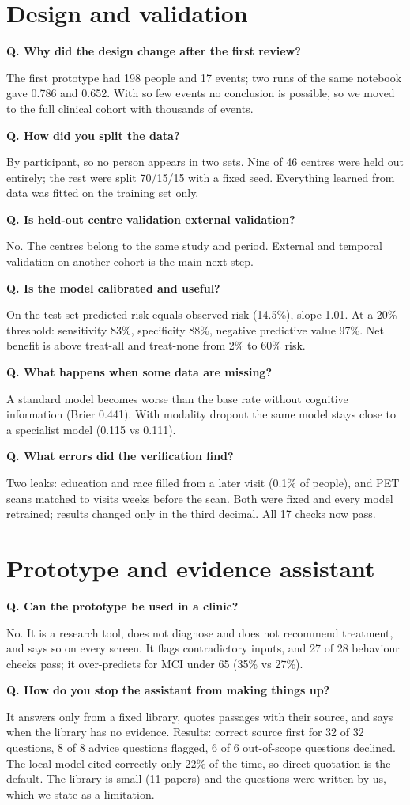 \documentclass[11pt,a4paper]{article}
\newcommand{\q}[1]{\par\medskip\textbf{Q. #1}\par}
\begin{document}
\section{Design and validation}

\q{Why did the design change after the first review?}
The first prototype had 198 people and 17 events; two runs of the same notebook gave 0.786 and 0.652. With so few events no conclusion is possible, so we moved to the full clinical cohort with thousands of events.

\q{How did you split the data?}
By participant, so no person appears in two sets. Nine of 46 centres were held out entirely; the rest were split 70/15/15 with a fixed seed. Everything learned from data was fitted on the training set only.

\q{Is held-out centre validation external validation?}
No. The centres belong to the same study and period. External and temporal validation on another cohort is the main next step.

\q{Is the model calibrated and useful?}
On the test set predicted risk equals observed risk (14.5\%), slope 1.01. At a 20\% threshold: sensitivity 83\%, specificity 88\%, negative predictive value 97\%. Net benefit is above treat-all and treat-none from 2\% to 60\% risk.

\q{What happens when some data are missing?}
A standard model becomes worse than the base rate without cognitive information (Brier 0.441). With modality dropout the same model stays close to a specialist model (0.115 vs 0.111).

\q{What errors did the verification find?}
Two leaks: education and race filled from a later visit (0.1\% of people), and PET scans matched to visits weeks before the scan. Both were fixed and every model retrained; results changed only in the third decimal. All 17 checks now pass.

\section{Prototype and evidence assistant}

\q{Can the prototype be used in a clinic?}
No. It is a research tool, does not diagnose and does not recommend treatment, and says so on every screen. It flags contradictory inputs, and 27 of 28 behaviour checks pass; it over-predicts for MCI under 65 (35\% vs 27\%).

\q{How do you stop the assistant from making things up?}
It answers only from a fixed library, quotes passages with their source, and says when the library has no evidence. Results: correct source first for 32 of 32 questions, 8 of 8 advice questions flagged, 6 of 6 out-of-scope questions declined. The local model cited correctly only 22\% of the time, so direct quotation is the default. The library is small (11 papers) and the questions were written by us, which we state as a limitation.
\end{document}
